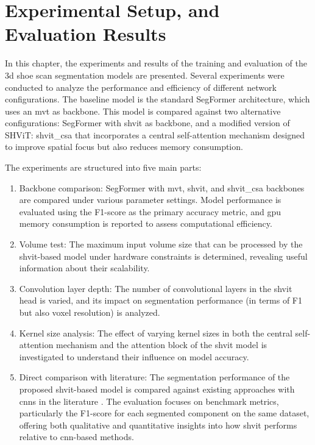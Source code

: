 \chapter{Experimental Setup, and Evaluation Results}\label{Results_and_Discussion}
In this chapter, the experiments and results of the training and evaluation of the \gls{3d} shoe scan segmentation models are presented. Several experiments were conducted to analyze the performance and efficiency of different network configurations. The baseline model is the standard SegFormer architecture, which uses an \gls{mvt} as backbone. This model is compared against two alternative configurations: SegFormer with \gls{shvit} as backbone, and a modified version of SHViT: \gls{shvit_csa} that incorporates a central self-attention mechanism designed to improve spatial focus but also reduces memory consumption.

\medskip

\noindent The experiments are structured into five main parts:
\begin{enumerate}
	\item Backbone comparison: SegFormer with \gls{mvt}, \gls{shvit}, and \gls{shvit_csa} backbones are compared under various parameter settings. Model performance is evaluated using the F1-score as the primary accuracy metric, and \acrshort{gpu} memory consumption is reported to assess computational efficiency.
	
	\item Volume test: The maximum input volume size that can be processed by the \gls{shvit}-based model under hardware constraints is determined, revealing useful information about their scalability.
	
	\item Convolution layer depth: The number of convolutional layers in the \gls{shvit} head is varied, and its impact on segmentation performance (in terms of F1 but also voxel resolution) is analyzed.
	
	\item Kernel size analysis: The effect of varying kernel sizes in both the central self-attention mechanism and the attention block of the \gls{shvit} model is investigated to understand their influence on model accuracy.
	
	\item Direct comparison with literature: The segmentation performance of the proposed \gls{shvit}-based model is compared against existing approaches with \glspl{cnn} in the literature \cite{contribution_martin_leipert}. The evaluation focuses on benchmark metrics, particularly the F1-score for each segmented component on the same dataset, offering both qualitative and quantitative insights into how \gls{shvit} performs relative to \gls{cnn}-based methods.
\end{enumerate}

